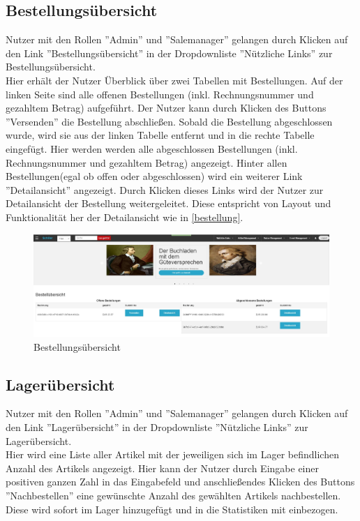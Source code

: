 \documentclass[a4paper]{article}
\begin{document}
\FloatBarrier

\subsection{Bestellungsübersicht}

Nutzer mit den Rollen ''Admin'' und ''Salemanager'' gelangen durch Klicken auf den Link ''Bestellungsübersicht'' in der Dropdownliste ''Nützliche Links'' zur Bestellungsübersicht. \\
Hier erhält der Nutzer Überblick über zwei Tabellen mit Bestellungen. Auf der linken Seite sind alle offenen Bestellungen (inkl. Rechnungsnummer und gezahltem Betrag) aufgeführt. Der Nutzer kann durch Klicken des Buttons ''Versenden'' die Bestellung abschließen. Sobald die Bestellung abgeschlossen wurde, wird sie aus der linken Tabelle entfernt und in die rechte Tabelle eingefügt. Hier werden werden alle abgeschlossen Bestellungen (inkl. Rechnungsnummer und gezahltem Betrag) angezeigt. Hinter allen Bestellungen(egal ob offen oder abgeschlossen) wird ein weiterer Link ''Detailansicht'' angezeigt. Durch Klicken dieses Links wird der Nutzer zur Detailansicht der Bestellung weitergeleitet. Diese entspricht von Layout und Funktionalität her der Detailansicht wie in \ref{bestellung}.

\begin{figure}[ht]
\centering
\includegraphics[width=1.0\textwidth]{Bestellungsansicht.jpg}
\caption{Bestellungsübersicht}
\end{figure}
\smallskip

\FloatBarrier

\subsection{Lagerübersicht}

Nutzer mit den Rollen ''Admin'' und ''Salemanager'' gelangen durch Klicken auf den Link ''Lagerübersicht'' in der Dropdownliste ''Nützliche Links'' zur Lagerübersicht. \\
Hier wird eine Liste aller Artikel mit der jeweiligen sich im Lager befindlichen Anzahl des Artikels angezeigt. Hier kann der Nutzer durch Eingabe einer positiven ganzen Zahl in das Eingabefeld und anschließendes Klicken des Buttons ''Nachbestellen'' eine gewünschte Anzahl des gewählten Artikels nachbestellen. Diese wird sofort im Lager hinzugefügt und in die Statistiken mit einbezogen.
\end{document}
